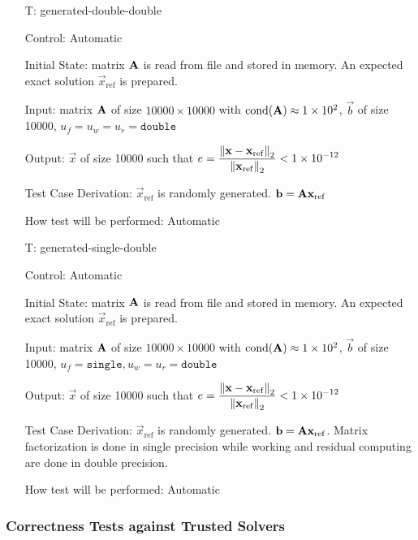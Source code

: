\documentclass[12pt, titlepage]{article}
\newcounter{testnum} %
\begin{document}
\begin{itemize}

\item[T\refstepcounter{testnum}\thetestnum \label{T:gdd}:]{generated-double-double}

Control: Automatic

Initial State: matrix \(\mathbf{A}\) is read from file and stored in memory.
An expected exact solution \(\vec{x}_\mathrm{ref}\) is prepared.

Input: matrix \(\mathbf{A}\) of size \(\num{10000} \times \num{10000}\) with
\(\mathrm{cond}(\mathbf{A}) \approx \num{1e2}\), \(\vec{b}\) of size \num{10000}, \(u_f =
u_w = u_r = \texttt{double}\)

Output: \(\vec{x}\) of size \num{10000} such that \(e = \displaystyle \frac{\left\lVert\mathbf{x} -
    \mathbf{x}_\mathrm{ref}\right\rVert_2}{\left\lVert\mathbf{x}_\mathrm{ref}\right\rVert_2} < \num{1e-12}\)

Test Case Derivation: \(\vec{x}_\mathrm{ref}\) is randomly generated. \(\mathbf{b} = \mathbf{A}\mathbf{x}_\mathrm{ref}\)

How test will be performed: Automatic

\item[T\refstepcounter{testnum}\thetestnum \label{T:gsd}:]{generated-single-double}

Control: Automatic

Initial State: matrix \(\mathbf{A}\) is read from file and stored in memory.
An expected exact solution \(\vec{x}_\mathrm{ref}\) is prepared.

Input: matrix \(\mathbf{A}\) of size \(\num{10000} \times \num{10000}\) with
\(\mathrm{cond}(\mathbf{A}) \approx \num{1e2}\), \(\vec{b}\) of size \num{10000}, \(u_f = \texttt{single}, u_w
= u_r = \texttt{double}\)

Output: \(\vec{x}\) of size \num{10000} such that \(e = \displaystyle \frac{\left\lVert\mathbf{x} -
    \mathbf{x}_\mathrm{ref}\right\rVert_2}{\left\lVert\mathbf{x}_\mathrm{ref}\right\rVert_2} < \num{1e-12}\)

Test Case Derivation: \(\vec{x}_\mathrm{ref}\) is randomly generated. \(\mathbf{b} =
\mathbf{A}\mathbf{x}_\mathrm{ref}\). Matrix factorization is done in single precision while
working and residual computing are done in double precision.

How test will be performed: Automatic

\end{itemize}

\subsubsection{Correctness Tests against Trusted Solvers}
\end{document}
